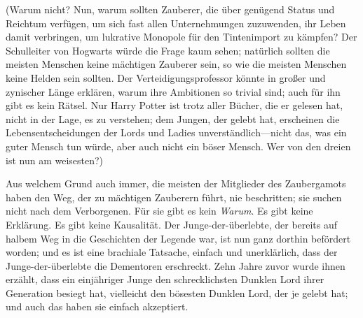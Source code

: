 (Warum nicht? Nun, warum sollten Zauberer, die über genügend Status und Reichtum verfügen, um sich fast allen Unternehmungen zuzuwenden, ihr Leben damit verbringen, um lukrative Monopole für den Tintenimport zu kämpfen?
Der Schulleiter von Hogwarts würde die Frage kaum sehen; natürlich sollten die meisten Menschen keine mächtigen Zauberer sein, so wie die meisten Menschen keine Helden sein sollten.
Der Verteidigungsprofessor könnte in großer und zynischer Länge erklären, warum ihre Ambitionen so trivial sind; auch für ihn gibt es kein Rätsel.
Nur Harry Potter ist trotz aller Bücher, die er gelesen hat, nicht in der Lage, es zu verstehen; dem Jungen, der gelebt hat, erscheinen die Lebensentscheidungen der Lords und Ladies unverständlich—nicht das, was ein guter Mensch tun würde, aber auch nicht ein böser Mensch. Wer von den dreien ist nun am weisesten?)

Aus welchem Grund auch immer, die meisten der Mitglieder des Zaubergamots haben den Weg, der zu mächtigen Zauberern führt, nie beschritten; sie suchen nicht nach dem Verborgenen. Für sie gibt es kein \emph{Warum}. Es gibt keine Erklärung. Es gibt keine Kausalität. Der Junge-der-überlebte, der bereits auf halbem Weg in die Geschichten der Legende war, ist nun ganz dorthin befördert worden; und es ist eine brachiale Tatsache, einfach und unerklärlich, dass der Junge-der-überlebte die Dementoren erschreckt. Zehn Jahre zuvor wurde ihnen erzählt, dass ein einjähriger Junge den schrecklichsten Dunklen Lord ihrer Generation besiegt hat, vielleicht den bösesten Dunklen Lord, der je gelebt hat; und auch das haben sie einfach akzeptiert.


